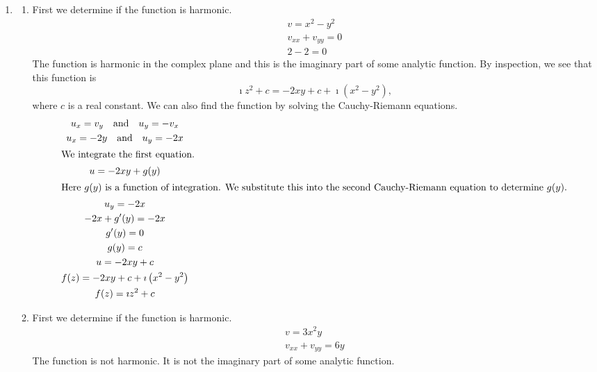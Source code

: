 {\begin{Solution}
\begin{enumerate}
\begin{enumerate}
      the function is analytic everywhere except $z = 1$.
    \end{enumerate}
  \item
    \begin{enumerate}
    \item
      First we determine if the function is harmonic.
      \begin{gather*}
        v = x^2 - y^2 
        \\
        v_{x x} + v_{y y} = 0 
        \\
        2 - 2 = 0
      \end{gather*}
      The function is harmonic in the complex plane and this is the
      imaginary part of some analytic function.  By inspection, we see
      that this function is
      \[
      \imath z^2 + c = - 2 x y + c + \imath  \left( x^2 - y^2 \right),
      \]
      where $c$ is a real constant.
      We can also find the function by solving the Cauchy-Riemann equations.
      \begin{gather*}
        u_x = v_y \quad \mathrm{and} \quad u_y = - v_x 
        \\
        u_x = - 2 y \quad \mathrm{and} \quad u_y = - 2 x 
        \\
        \intertext{We integrate the first equation.}
        u = - 2 x y + g(y) 
        \\
        \intertext{Here $g(y)$ is a function of integration.  We substitute 
          this into the second Cauchy-Riemann equation to determine $g(y)$.}
        u_y = - 2 x 
        \\
        -2 x + g'(y) = -2 x 
        \\
        g'(y) = 0 
        \\
        g(y) = c 
        \\
        u = - 2 x y + c 
        \\
        f(z) = -2 x y + c + \imath  \left( x^2 - y^2 \right) 
        \\
        f(z) = \imath z^2 + c
      \end{gather*}
    \item
      First we determine if the function is harmonic.
      \begin{gather*}
        v = 3 x^2 y 
        \\
        v_{x x} + v_{y y} = 6 y 
      \end{gather*}
      The function is not harmonic.  It is not the imaginary 
      part of some analytic function.  
    \end{enumerate}
  \end{enumerate}
\end{Solution}











}
